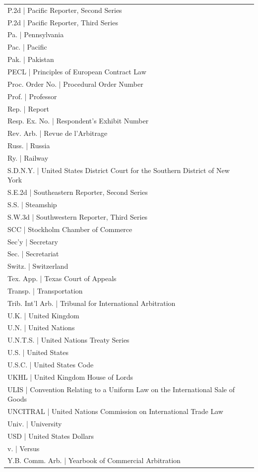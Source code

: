 \begin{longtable}[l]{p{1.3in}p{5.1in}}
P.2d        | Pacific Reporter, Second Series \\
P.2d        | Pacific Reporter, Third Series \\
Pa.         | Pennsylvania \\
Pac.        | Pacific \\
Pak.        | Pakistan \\
PECL        | Principles of European Contract Law \\
Proc. Order No. | Procedural Order Number \\
Prof.       | Professor \\
Rep.        | Report \\
Resp. Ex. No. | Respondent's Exhibit Number \\
Rev. Arb.   | Revue de l'Arbitrage \\
Russ.       | Russia \\
Ry.         | Railway \\
S.D.N.Y.    | United States District Court for the Southern District of New York \\
S.E.2d      | Southeastern Reporter, Second Series \\
S.S.        | Steamship\\
S.W.3d      | Southwestern Reporter, Third Series \\
SCC         | Stockholm Chamber of Commerce \\
Sec'y       | Secretary \\
Sec.        | Secretariat \\
Switz.     | Switzerland\\
Tex. App.   | Texas Court of Appeals \\
Transp.     | Transportation \\
Trib. Int'l Arb. | Tribunal for International Arbitration \\
U.K.        | United Kingdom \\
U.N.        | United Nations \\
U.N.T.S.    | United Nations Treaty Series\\    
U.S.        | United States \\
U.S.C.      | United States Code \\
UKHL        | United Kingdom House of Lords \\
ULIS        | Convention Relating to a Uniform Law on the International Sale of Goods \\
UNCITRAL    | United Nations Commission on International Trade Law \\
Univ.       | University \\
USD         | United States Dollars  \\
v.          | Versus \\
Y.B. Comm. Arb. | Yearbook of Commercial Arbitration \\
\end{longtable}


